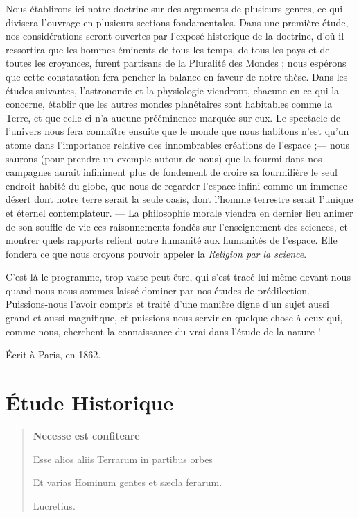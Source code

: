 \documentclass[a4paper, 11pt, oneside, landscape]{article}
\begin{document}
Nous établirons ici notre doctrine sur des arguments de plusieurs genres, ce qui divisera l'ouvrage en plusieurs sections fondamentales. Dans une première étude, nos considérations seront ouvertes par l'exposé historique de la doctrine, d'où il ressortira que les hommes éminents de tous les temps, de tous les pays et de toutes les croyances, furent partisans de la Pluralité des Mondes ; nous espérons que cette constatation fera pencher la balance en faveur de notre thèse. Dans les études suivantes, l'astronomie et la physiologie viendront, chacune en ce qui la concerne, établir que les autres mondes planétaires sont habitables comme la Terre, et que celle-ci n'a aucune prééminence marquée sur eux. Le spectacle de l'univers nous fera connaître ensuite que le monde que nous habitons n'est qu'un atome dans l'importance relative des innombrables créations de l'espace ;--- nous saurons (pour prendre un exemple autour de nous) que la fourmi dans nos campagnes aurait infiniment plus de fondement de croire sa fourmilière le seul endroit habité du globe, que nous de regarder l'espace infini comme un immense désert dont notre terre serait la seule oasis, dont l'homme terrestre serait l'unique et éternel contemplateur. --- La philosophie morale viendra en dernier lieu animer de son souffle de vie ces raisonnements fondés sur l'enseignement des sciences, et montrer quels rapports relient notre humanité aux humanités de l'espace. Elle fondera ce que nous croyons pouvoir appeler la \emph{Religion par la science}.

C'est là le programme, trop vaste peut-être, qui s'est tracé lui-même devant nous quand nous nous sommes laissé dominer par nos études de prédilection. Puissions-nous l'avoir compris et traité d'une manière digne d'un sujet aussi grand et aussi magnifique, et puissions-nous servir en quelque chose à ceux qui, comme nous, cherchent la connaissance du vrai dans l'étude de la nature !

\bigskip

Écrit à Paris, en 1862.
\clearpage
\section{Étude Historique}
\begin{quotation}\bfseries\small
Necesse est confiteare

Esse alios aliis Terrarum in partibus orbes

Et varias Hominum gentes et sæcla ferarum.

\hspace*{5mm}Lucretius.
\end{quotation}
\end{document}
